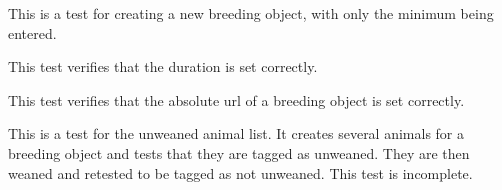 \documentclass[letterpaper,10pt,english]{sphinxmanual}
\begin{document}
\begin{fulllineitems}
\begin{fulllineitems}
\label{api:mousedb.animal.tests.BreedingModelTests.test_create_breeding_minimal}
This is a test for creating a new breeding object, with only the minimum being entered.

\end{fulllineitems}


\begin{fulllineitems}
\label{api:mousedb.animal.tests.BreedingModelTests.test_duration}
This test verifies that the duration is set correctly.

\end{fulllineitems}


\begin{fulllineitems}
\label{api:mousedb.animal.tests.BreedingModelTests.test_study_absolute_url}
This test verifies that the absolute url of a breeding object is set correctly.

\end{fulllineitems}


\begin{fulllineitems}
\label{api:mousedb.animal.tests.BreedingModelTests.test_unweaned}
This is a test for the unweaned animal list.  It creates several animals for a breeding object and tests that they are tagged as unweaned.  They are then weaned and retested to be tagged as not unweaned.  This test is incomplete.

\end{fulllineitems}


\end{fulllineitems}

\end{document}

